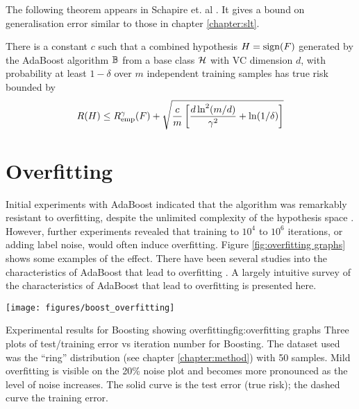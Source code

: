 The following theorem appears in Schapire et. al \cite{Schapire97}.
It gives a bound on generalisation error similar to those in chapter
\ref{chapter:slt}.

\begin{theorem}[Performance bound for boosting ($p$=1)]

There is a constant $c$ such that a combined hypothesis $H = \mathrm{sign}(F)$
generated by the AdaBoost algorithm $\mathbb{B}$ from a base class $\mathcal{H}$
with VC dimension $d$, with probability at least $1 - \delta$ over $m$
independent training samples has true risk bounded by 
\begin{equation}
R(H) \leq R_{\mathrm{emp}}^{\gamma}(F) + \sqrt{\frac{c}{m} \left[ \frac{d
\ln^2 (m/d)}{\gamma^2} + \ln(1/\delta) \right] }
\end{equation}
\end{theorem}


\section{Overfitting}
\label{sec:boost overfitting}

Initial experiments with AdaBoost indicated that the algorithm was
remarkably resistant to overfitting, despite the unlimited complexity
of the hypothesis space \cite{Freund96}.
However, further experiments \cite{Grove98, Bauer99} revealed that
training to $10^4$ to $10^6$ iterations, or adding label noise, would
often induce overfitting.  Figure \ref{fig:overfitting graphs} shows some
examples of the effect.  There have been several studies into the
characteristics of AdaBoost that lead to overfitting \cite{Schapire97,
Grove98, Ratsch98}.  A largely intuitive survey of the characteristics
of AdaBoost that lead to overfitting is presented here. 

\begin{linefigure}
\begin{center}
\texttt{[image: figures/boost\_overfitting]}
\end{center}
\begin{capt}{Experimental results for Boosting showing
overfitting}{fig:overfitting graphs}
Three plots of test/training error vs iteration number for Boosting.
The dataset used was the ``ring'' distribution (see chapter
\ref{chapter:method}) with 50 samples.  Mild overfitting is visible on
the 20\% noise plot and becomes more pronounced as the level of noise
increases.  The solid curve is the test error (true risk); the dashed
curve the training error.
\end{capt}
\end{linefigure}

